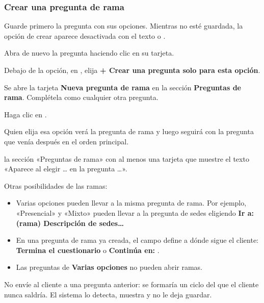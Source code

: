 \subsubsection{Crear una pregunta de rama}

\begin{pasos}
  \item Guarde primero la pregunta con sus opciones. Mientras no esté guardada, la opción de
        crear aparece desactivada con el texto  o
        .
  \item Abra de nuevo la pregunta haciendo clic en su tarjeta.
  \item Debajo de la opción, en , elija
        \textbf{+ Crear una pregunta solo para esta opción}.
  \item Se abre la tarjeta \textbf{Nueva pregunta de rama} en la sección \textbf{Preguntas de
        rama}. Complétela como cualquier otra pregunta.
  \item Haga clic en .
\end{pasos}

\begin{resultado}
Quien elija esa opción verá la pregunta de rama y luego seguirá con la pregunta que venía
después en el orden principal.
\end{resultado}

  {la sección «Preguntas de rama» con al menos una tarjeta que muestre el texto «Aparece al
   elegir … en la pregunta …».}

Otras posibilidades de las ramas:

\begin{itemize}
  \item Varias opciones pueden llevar a la misma pregunta de rama. Por ejemplo, «Presencial» y
        «Mixto» pueden llevar a la pregunta de sedes eligiendo
        \textbf{Ir a: (rama) Descripción de sedes…}
  \item En una pregunta de rama ya creada, el campo  define a
        dónde sigue el cliente: \textbf{Termina el cuestionario} o
        \textbf{Continúa en: }.
  \item Las preguntas de \textbf{Varias opciones} no pueden abrir ramas.
\end{itemize}

\begin{importante}
No envíe al cliente a una pregunta anterior: se formaría un ciclo del que el cliente nunca
saldría. El sistema lo detecta, muestra  y no le deja guardar.
\end{importante}

